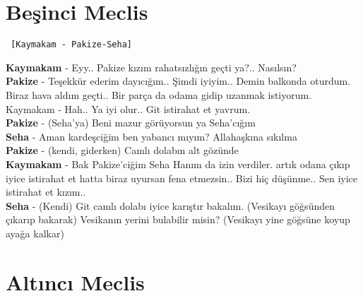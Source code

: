 \documentclass[]{book}
\begin{document}
\hypertarget{besinci-meclis-2}{%
\section{Beşinci Meclis}\label{besinci-meclis-2}}

\begin{verbatim}
 [Kaymakam - Pakize-Seha]
\end{verbatim}

\textbf{Kaymakam} - Eyy.. Pakize kızım rahatsızlığın geçti ya?.. Nasılsın?\\
\textbf{Pakize} - Teşekkür ederim dayıcığım.. Şimdi iyiyim.. Demin balkonda oturdum. Biraz hava aldım geçti.. Bir parça da odama gidip uzanmak istiyorum.\\
Kaymakam - Hah.. Ya iyi olur.. Git istirahat et yavrum.\\
\textbf{Pakize} - (Seha'ya) Beni mazur görüyorsun ya Seha'cığım\\
\textbf{Seha} - Aman kardeşciğim ben yabancı mıyım? Allahaşkına sıkılma\\
\textbf{Pakize} - (kendi, giderken) Camlı dolabın alt gözünde\\
\textbf{Kaymakam} - Bak Pakize'ciğim Seha Hanım da izin verdiler. artık odana çıkıp iyice istirahat et hatta biraz uyursan fena etmezsin.. Bizi hiç düşünme.. Sen iyice istirahat et kızım..\\
\textbf{Seha} - (Kendi) Git camlı dolabı iyice karıştır bakalım. (Vesikayı göğsünden çıkarıp bakarak) Vesikanın yerini bulabilir misin? (Vesikayı yine göğsüne koyup ayağa kalkar)\\

\hypertarget{altinci-meclis-2}{%
\section{Altıncı Meclis}\label{altinci-meclis-2}}
\end{document}
